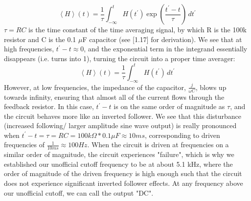 \documentclass{article}
\begin{document}
    \begin{equation}
        \displaystyle\left<H\right>(t)=\frac{1}{\tau}\int_{-\infty}^{t}H(t^\prime)\exp\left(\frac{t^\prime-t}{\tau}\right)\,dt^\prime
    \end{equation}
    $\tau = RC$ is the time constant of the time averaging signal, by which R is the 100k resistor and C is the 0.1 $\mu$F capacitor (see [1.17] for derivation). We see that at high frequencies, $t^\prime - t \approx 0$, and the exponential term in the integrand essentially disappears (i.e. turns into 1), turning the circuit into a proper time averager:
    \begin{equation}
        \displaystyle\left<H\right>(t)=\frac{1}{\tau}\int_{-\infty}^{t}H(t^\prime)\,dt^\prime
    \end{equation}
    However, at low frequencies, the impedance of the capacitor, $\frac{j}{\omega C}$, blows up towards infinity, ensuring that almost all of the current flows through the feedback resistor. In this case, $t^\prime - t$ is on the same order of magnitude as $\tau$, and the circuit behaves more like an inverted follower. We see that this disturbance (increased following/ larger amplitude sine wave output) is really pronounced when $t^\prime - t = \tau = RC = 100k\Omega *0.1\mu F \approx 10ms$, corresponding to driven frequencies of $\frac{1}{10ms} \approx 100Hz$. When the circuit is driven at frequencies on a similar order of magnitude, the circuit experiences "failure", which is why we established our unofficial cutoff frequency to be at about 5.1 kHz, where the order of magnitude of the driven frequency is high enough such that the circuit does not experience significant inverted follower effects. At any frequency above our unofficial cutoff, we can call the output "DC".
    
\end{document}
